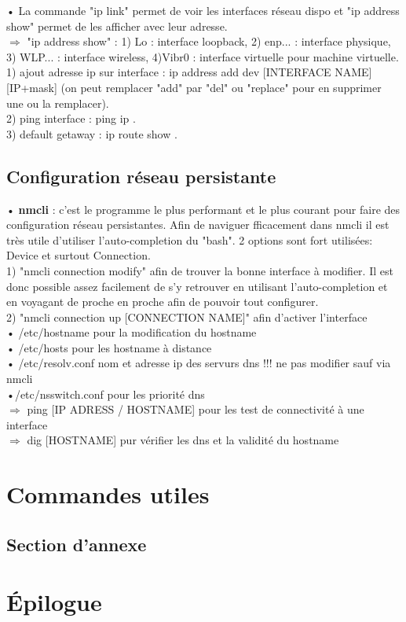 \documentclass[a4paper, 11pt, french, oneside]{book}
\begin{document}
 
• La commande "ip link" permet de voir les interfaces réseau dispo et "ip address show" permet de les afficher avec leur adresse.\\


 $\Rightarrow$ "ip address show" : 1) Lo : interface  loopback, 2) enp... : interface physique, 3) WLP... : interface wireless, 4)Vibr0 : interface virtuelle pour machine virtuelle. \\
 
 1) ajout adresse ip sur interface : ip address add dev [INTERFACE NAME] [IP+mask] (on peut remplacer "add" par "del" ou "replace" pour en supprimer une ou la remplacer).\\
 2) ping interface : ping ip .\\
 3) default getaway : ip route show .\\
 
 
\section{\Large Configuration réseau persistante}

• \textbf{nmcli}  : c'est le programme le plus performant et le plus courant pour faire des configuration réseau persistantes. Afin de naviguer fficacement dans nmcli il est très utile d'utiliser l'auto-completion du "bash". 2 options sont fort utilisées: Device et surtout Connection. \\

1) "nmcli connection modify" afin de trouver la bonne interface à modifier. Il est donc possible assez facilement de s'y retrouver en utilisant l'auto-completion et en voyagant de proche en proche afin de pouvoir tout configurer.\\
2) "nmcli connection up [CONNECTION NAME]" afin d'activer l'interface\\


• /etc/hostname pour la modification du hostname \\
• /etc/hosts pour les hostname à distance\\
• /etc/resolv.conf nom et adresse ip des servurs dns !!! ne pas modifier sauf via nmcli\\
•/etc/nsswitch.conf pour les priorité dns\\ 


$\Rightarrow$ ping [IP ADRESS / HOSTNAME] pour les test de connectivité à une interface \\
$\Rightarrow$  dig [HOSTNAME] pur vérifier les dns et la validité du hostname\\


 
   \appendix
   \chapter{Commandes utiles}
      \section{Section d'annexe}
    
   \backmatter
   
   \chapter{Épilogue}
\end{document}
